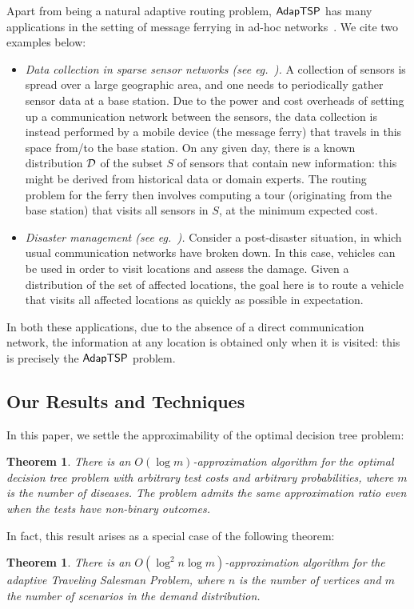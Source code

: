 \documentclass[11pt]{article}
\newtheorem{theorem}[thm]{Theorem}
\def\stsp{\ensuremath{{\sf AdapTSP}}\xspace}
\def\dtp{optimal decision tree problem\xspace}
\begin{document}
\medskip
Apart from being a natural adaptive routing problem, \stsp has many applications in the setting of message ferrying in
ad-hoc networks~\cite{ZA03,SRJB03,ZAZ04,ZAZ05,HLS10}. We cite two examples below:
\begin{itemize}
\item {\em Data collection in sparse sensor networks (see eg.~\cite{SRJB03}).} A collection of sensors is spread over a large geographic area, and
one needs to periodically gather sensor data at a base station. Due to the power and cost overheads of setting up a
communication network between the sensors, the data collection is instead performed by a mobile device (the message
ferry) that travels in this space from/to the base station. On any given day, there is a known distribution ${\cal D}$
of the subset $S$ of sensors that contain new information: this might be derived from historical data or domain
experts. The routing problem for the ferry then involves computing a tour (originating from the base station) that
visits all sensors in $S$, at the minimum expected cost.

\item {\em Disaster management (see eg.~\cite{ZAZ04}).} Consider a post-disaster situation, in which usual
communication networks have broken down. In this case, vehicles can be used in order
to visit locations and assess the damage. Given a distribution of the set of affected locations, the goal here is to
route a vehicle that visits all affected locations as quickly as possible  in expectation.
\end{itemize}
In both these applications, due to the absence of a direct communication network, the information at any location is
obtained only when it is visited: this is precisely the \stsp problem.







\subsection{Our Results and Techniques}
In this paper, we settle the approximability of the \dtp:
\begin{theorem}
  \label{thm:main1}
  There is an $O(\log m)$-approximation algorithm for the \dtp with arbitrary test
  costs and arbitrary probabilities, where $m$ is the number of diseases. The problem admits the same
  approximation ratio even when the tests have non-binary outcomes.
\end{theorem}
In fact, this result arises as a special case of the following theorem:
\begin{theorem}
  \label{thm:main2}
  There is an $O(\log^2 n \log m)$-approximation algorithm for
  the adaptive Traveling Salesman Problem, where $n$ is the number of vertices and $m$ the number of scenarios in the
  demand distribution.
\end{theorem}
\end{document}

